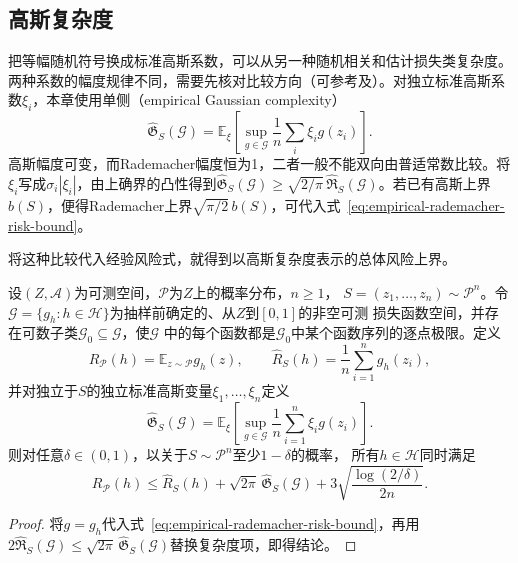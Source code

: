 \subsection{高斯复杂度}

把等幅随机符号换成标准高斯系数，可以从另一种随机相关和估计损失类复杂度。两种系数的幅度规律不同，需要先核对比较方向（可参考及）。对独立标准高斯系数$\xi_i$，本章使用单侧（empirical Gaussian complexity）
\[
 \widehat{\mathfrak G}_S(\mathcal G)
 =\mathbb E_\xi\left[\sup_{g\in\mathcal G}\frac1n\sum_i \xi_i g(z_i)\right].
\]
高斯幅度可变，而Rademacher幅度恒为1，二者一般不能双向由普适常数比较。将$\xi_i$写成$\sigma_i|\xi_i|$，由上确界的凸性得到$\widehat{\mathfrak G}_S(\mathcal G)\geq\sqrt{2/\pi}\,\widehat{\mathfrak R}_S(\mathcal G)$。若已有高斯上界$b(S)$，便得Rademacher上界$\sqrt{\pi/2}\,b(S)$，可代入式~\eqref{eq:empirical-rademacher-risk-bound}。

将这种比较代入经验风险式，就得到以高斯复杂度表示的总体风险上界。

\begin{theorem}[高斯复杂度给出的期望风险上界]
\label{thm:gaussian-risk-bound}
设$(Z,\mathcal A)$为可测空间，$\mathcal P$为$Z$上的概率分布，$n\geq1$，
$S=(z_1,\ldots,z_n)\sim\mathcal P^n$。令
$\mathcal G=\{g_h:h\in\mathcal H\}$为抽样前确定的、从$Z$到$[0,1]$的非空可测
损失函数空间，并存在可数子类$\mathcal G_0\subseteq\mathcal G$，使$\mathcal G$
中的每个函数都是$\mathcal G_0$中某个函数序列的逐点极限。定义
\[
 R_{\mathcal P}(h)=\mathbb E_{z\sim\mathcal P}g_h(z),\qquad
 \hat R_S(h)=\frac1n\sum_{i=1}^n g_h(z_i),
\]
并对独立于$S$的独立标准高斯变量$\xi_1,\ldots,\xi_n$定义
\[
 \widehat{\mathfrak G}_S(\mathcal G)
 =\mathbb E_\xi\left[\sup_{g\in\mathcal G}
   \frac1n\sum_{i=1}^n\xi_i g(z_i)\right].
\]
则对任意$\delta\in(0,1)$，以关于$S\sim\mathcal P^n$至少$1-\delta$的概率，
所有$h\in\mathcal H$同时满足
\begin{equation}
 R_{\mathcal P}(h)\leq\hat R_S(h)
 +\sqrt{2\pi}\,\widehat{\mathfrak G}_S(\mathcal G)
 +3\sqrt{\frac{\log(2/\delta)}{2n}}.
 \label{eq:gaussian-risk-bound}
\end{equation}
\end{theorem}

\begin{proof}
将$g=g_h$代入式~\eqref{eq:empirical-rademacher-risk-bound}，再用$2\widehat{\mathfrak R}_S(\mathcal G)\leq\sqrt{2\pi}\,\widehat{\mathfrak G}_S(\mathcal G)$替换复杂度项，即得结论。
\end{proof}

